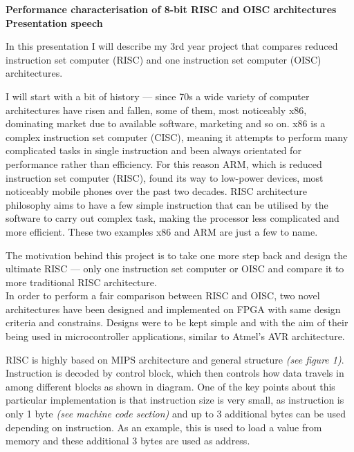 \documentclass[a4paper,12pt]{article}
\begin{document}
	\begin{titlepage}
	\begin{center}
	{ \Large \bfseries Performance characterisation of 8-bit RISC and OISC architectures}\\[0.2cm]
	\large\bfseries Presentation speech
	\end{center}

	In this presentation I will describe my 3rd year project that compares reduced instruction set computer (RISC) and one instruction set computer (OISC) architectures.
	
	I will start with a bit of history — since 70s a wide variety of  computer architectures have risen and fallen, some of them, most noticeably x86, dominating market due to available software, marketing and so on. x86 is a complex instruction set computer (CISC), meaning it attempts to perform many complicated tasks in single instruction and been always orientated for performance rather than efficiency. For this reason ARM, which is reduced instruction set computer (RISC), found its way to low-power devices, most noticeably mobile phones over the past two decades.
	RISC architecture philosophy aims to have a few simple instruction that can be utilised by the software to carry out complex task, making the processor less complicated and more efficient. These two examples x86 and ARM are just a few to name.
	
	The motivation behind this project is to take one more step back and design the ultimate RISC — only one instruction set computer or OISC and compare it to more traditional RISC architecture.
	\\[-3pt]
	
	In order to perform a fair comparison between RISC and OISC, two novel architectures have been designed and implemented on FPGA with same design criteria and constrains. Designs were to be kept
	simple and with the aim of their being used in microcontroller applications, similar to Atmel's AVR architecture. 
	
	RISC is highly based on MIPS architecture and general structure \textit{(see figure 1)}. Instruction is decoded by control block, which then controls how data travels in among different blocks as shown in diagram. One of the key points about this particular implementation is that instruction size is very small, as instruction is only 1 byte \textit{(see machine code section)} and up to 3 additional bytes can be used depending on instruction. As an example, this is used to load a value from memory and these additional 3 bytes are used as address.
	

\end{titlepage}
\end{document}

